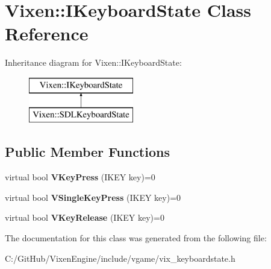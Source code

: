 \hypertarget{class_vixen_1_1_i_keyboard_state}{}\section{Vixen\+:\+:I\+Keyboard\+State Class Reference}
\label{class_vixen_1_1_i_keyboard_state}
Inheritance diagram for Vixen\+:\+:I\+Keyboard\+State\+:\begin{figure}[H]
\begin{center}
\leavevmode
\includegraphics[height=2.000000cm]{class_vixen_1_1_i_keyboard_state}
\end{center}
\end{figure}
\subsection*{Public Member Functions}
\begin{DoxyCompactItemize}
\item 
\hypertarget{class_vixen_1_1_i_keyboard_state_a3c66f2ead4338660f9ecc90d8f0ca344}{}virtual bool {\bfseries V\+Key\+Press} (I\+K\+E\+Y key)=0\label{class_vixen_1_1_i_keyboard_state_a3c66f2ead4338660f9ecc90d8f0ca344}

\item 
\hypertarget{class_vixen_1_1_i_keyboard_state_a3de1743292864d93dddb8f64e5e33883}{}virtual bool {\bfseries V\+Single\+Key\+Press} (I\+K\+E\+Y key)=0\label{class_vixen_1_1_i_keyboard_state_a3de1743292864d93dddb8f64e5e33883}

\item 
\hypertarget{class_vixen_1_1_i_keyboard_state_ae7ab07a182519df05f0f421e397088d8}{}virtual bool {\bfseries V\+Key\+Release} (I\+K\+E\+Y key)=0\label{class_vixen_1_1_i_keyboard_state_ae7ab07a182519df05f0f421e397088d8}

\end{DoxyCompactItemize}


The documentation for this class was generated from the following file\+:\begin{DoxyCompactItemize}
\item 
C\+:/\+Git\+Hub/\+Vixen\+Engine/include/vgame/vix\+\_\+keyboardstate.\+h\end{DoxyCompactItemize}
